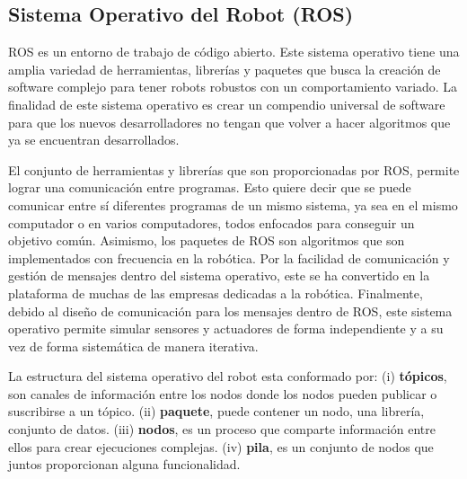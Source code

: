 \subsection{Sistema Operativo del Robot (ROS)}
ROS es un entorno de trabajo de código abierto. Este sistema operativo 
tiene una amplia variedad de herramientas, librerías y paquetes que busca 
la creación de software complejo para tener robots robustos con un comportamiento 
variado. La finalidad de este sistema operativo es crear un compendio universal de 
software para que los nuevos desarrolladores no tengan que volver a hacer algoritmos 
que ya se encuentran desarrollados.

El conjunto de herramientas y librerías que son proporcionadas por ROS, permite 
lograr una comunicación entre programas. Esto quiere decir que se puede comunicar 
entre sí diferentes programas de un mismo sistema, ya sea en el mismo computador 
o en varios computadores, todos enfocados para conseguir un objetivo común. 
Asimismo, los paquetes de ROS son algoritmos que son implementados con 
frecuencia en la robótica. Por la facilidad de comunicación y gestión de mensajes 
dentro del sistema operativo, este se ha convertido en la plataforma de muchas de 
las empresas dedicadas a la robótica. Finalmente, debido al diseño 
de comunicación para los mensajes dentro de ROS, este sistema operativo permite 
simular sensores y actuadores de forma independiente y a su vez de forma 
sistemática de manera iterativa.

La estructura del sistema operativo del robot esta conformado por: 
(i) \textbf{tópicos}, son canales de información entre los nodos donde los nodos 
pueden publicar o suscribirse a un tópico. (ii) \textbf{paquete}, puede contener un 
nodo, una librería, conjunto de datos. (iii) \textbf{nodos}, es un proceso que 
comparte información entre ellos para crear ejecuciones complejas. 
(iv) \textbf{pila}, es un conjunto de nodos que juntos proporcionan alguna 
funcionalidad.


